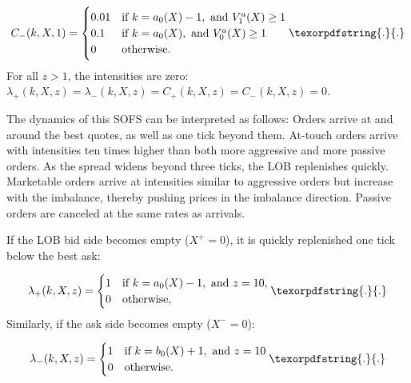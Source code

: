 \documentclass[10pt,a4paper,oneside]{article}
\providecommand{\DIFaddtex}[1]{{\protect\color{blue} \sf #1}} %
\providecommand{\DIFaddbegin}{} %
\providecommand{\DIFaddend}{} %
\providecommand{\DIFdelbegin}{} %
\providecommand{\DIFdelend}{} %
\providecommand{\DIFadd}[1]{\texorpdfstring{\DIFaddtex{#1}}{#1}} %
\newcommand{\DIFscaledelfig}{0.5}
\newlength{\DIFdelgraphicswidth} %
\newlength{\DIFdelgraphicsheight} %
\newcommand{\DIFaddincludegraphics}[2][]{{\color{blue}\fbox{\DIFOincludegraphics[#1]{#2}}}} %
\newcommand{\DIFdelincludegraphics}[2][]{%
\sbox{\DIFdelgraphicsbox}{\DIFOincludegraphics[#1]{#2}}%
\settoboxwidth{\DIFdelgraphicswidth}{\DIFdelgraphicsbox} %
\settoboxtotalheight{\DIFdelgraphicsheight}{\DIFdelgraphicsbox} %
\scalebox{\DIFscaledelfig}{%
\parbox[b]{\DIFdelgraphicswidth}{\usebox{\DIFdelgraphicsbox}\\[-\baselineskip] \rule{\DIFdelgraphicswidth}{0em}}\llap{\resizebox{\DIFdelgraphicswidth}{\DIFdelgraphicsheight}{%
\setlength{\unitlength}{\DIFdelgraphicswidth}%
\begin{picture}(1,1)%
\thicklines\linethickness{2pt} %
{\color[rgb]{1,0,0}\put(0,0){\framebox(1,1){}}}%
{\color[rgb]{1,0,0}\put(0,0){\line( 1,1){1}}}%
{\color[rgb]{1,0,0}\put(0,1){\line(1,-1){1}}}%
\end{picture}%
}\hspace*{3pt}}} %
} %
\DeclareRobustCommand{\DIFaddbegin}{\DIFOaddbegin \let\includegraphics\DIFaddincludegraphics} %
\DeclareRobustCommand{\DIFaddend}{\DIFOaddend \let\includegraphics\DIFOincludegraphics} %
\DeclareRobustCommand{\DIFdelbegin}{\DIFOdelbegin \let\includegraphics\DIFdelincludegraphics} %
\DeclareRobustCommand{\DIFdelend}{\DIFOaddend \let\includegraphics\DIFOincludegraphics} %
\begin{document}
\[
    C_-(k, X, 1) =
    \DIFdelbegin %
\DIFdelend \DIFaddbegin \begin{cases}
        0.01 & \text{if } k = a_0(X) - 1, \text{ and } V^a_1(X) \geq 1 \\
        0.1  & \text{if } k = a_0(X), \text{ and }  V^a_0(X) \geq 1    \\
        0    & \text{otherwise.}
    \end{cases}\DIFaddend \DIFaddbegin \DIFadd{.
}\DIFaddend \]
For all $z > 1$, the intensities are zero: $\lambda_+(k, X, z) = \lambda_-(k, X, z) = C_+(k, X, z) = C_-(k, X, z) = 0$.

The dynamics of this SOFS can be interpreted as follows: Orders arrive at and around the best quotes, as well as one tick beyond them. At-touch orders arrive with intensities ten times higher than both more aggressive and more passive orders. As the spread widens beyond three ticks, the LOB replenishes quickly. Marketable orders arrive at intensities similar to aggressive orders but increase with the imbalance, thereby pushing prices in the imbalance direction. Passive orders are canceled at the same rates as arrivals.


If the LOB bid side becomes empty ($X^+ = 0$), it is quickly replenished one tick below the best ask:

\[
    \lambda_+(k, X, z) =
    \DIFdelbegin %
\DIFdelend \DIFaddbegin \begin{cases}
        1 & \text{if } k = a_0(X) - 1, \text{ and } z = 10, \\
        0 & \text{otherwise,}
    \end{cases}\DIFaddend \DIFaddbegin \DIFadd{.
}\DIFaddend \]
Similarly, if the ask side becomes empty ($X^- = 0$):

\[
    \lambda_-(k, X, z) =
    \DIFdelbegin %
\DIFdelend \DIFaddbegin \begin{cases}
        1 & \text{if } k = b_0(X) + 1, \text{ and } z = 10 \\
        0 & \text{otherwise.}
    \end{cases}\DIFaddend \DIFaddbegin \DIFadd{.
}\DIFaddend \]
\end{document}
